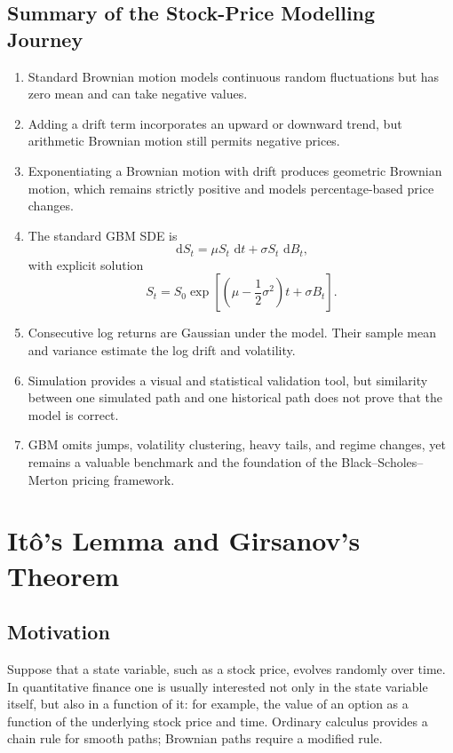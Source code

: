\documentclass[12pt,openany]{book}
\theoremstyle{definition}
\theoremstyle{remark}
\newcommand{\dd}{\,\mathrm{d}}
\begin{document}
\section{Summary of the Stock-Price Modelling Journey}

\begin{enumerate}
    \item Standard Brownian motion models continuous random fluctuations but
    has zero mean and can take negative values.

    \item Adding a drift term incorporates an upward or downward trend, but
    arithmetic Brownian motion still permits negative prices.

    \item Exponentiating a Brownian motion with drift produces geometric
    Brownian motion, which remains strictly positive and models
    percentage-based price changes.

    \item The standard GBM SDE is
    \[
    \dd S_t=\mu S_t\,\dd t+\sigma S_t\,\dd B_t,
    \]
    with explicit solution
    \[
    S_t
    =S_0\exp\!\left[
    \left(\mu-\frac12\sigma^2\right)t+\sigma B_t
    \right].
    \]

    \item Consecutive log returns are Gaussian under the model. Their sample
    mean and variance estimate the log drift and volatility.

    \item Simulation provides a visual and statistical validation tool, but
    similarity between one simulated path and one historical path does not
    prove that the model is correct.

    \item GBM omits jumps, volatility clustering, heavy tails, and regime
    changes, yet remains a valuable benchmark and the foundation of the
    Black--Scholes--Merton pricing framework.
\end{enumerate}

\chapter{Itô's Lemma and Girsanov's Theorem}

\section{Motivation}

Suppose that a state variable, such as a stock price, evolves randomly over
time.  In quantitative finance one is usually interested not only in the
state variable itself, but also in a function of it: for example, the value
of an option as a function of the underlying stock price and time.  Ordinary
calculus provides a chain rule for smooth paths; Brownian paths require a
modified rule.
\end{document}
